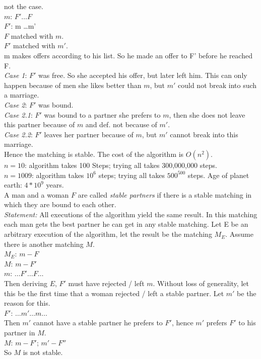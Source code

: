 not the case.\\
$m$: $F' \dots F$ \\
$F'$: m \dots m' \\
$F$ matched with $m$. \\
$F'$ matched with $m'$. \\
m makes offers according to his list. So he made an offer to F' before he
reached F.\\
\emph{Case 1}: $F'$ was free. So she accepted his offer, but later
left him.
This can only happen because of men she likes better than $m$, but $m'$ could not break
into such a marriage. \\
\emph{Case 2}: $F'$ was bound. \\
\emph{Case 2.1}: $F'$ was bound to a partner she prefers to $m$,
then she does not leave this partner because of $m$ and def. not because of $m'$.\\
\emph{Case 2.2}: $F'$ leaves her partner because of $m$, but $m'$
cannot break into this marriage. \\
Hence the matching is stable. The cost of the algorithm is $O(n^2)$. \\
$n=10$: algorithm takes 100 Steps; trying all takes 300,000,000 steps. \\
$n=1009$: algorithm takes $10^6$ steps;  trying all takes $500^500$ steps. Age
of planet earth: $4*10^9$ years.\\
A man and a woman $F$ are called \emph{stable partners} if there is a stable
matching in which they are bound to each other. \\
\emph{Statement:} All executions of the algorithm yield the same result. In this
matching each man gets the best partner he can get in any stable matching. Let E
be an arbitrary execution of the algorithm, let the result be the matching
$M_{E}$. Assume there is another matching $M$.\\
$M_{E}$: $m - F$ \\
$M$: $m - F'$ \\
$m$: $\dots F' \dots F \dots$ \\
Then deriving $E$, $F'$ must have rejected / left $m$. Without loss of
generality, let this be the first time that a woman rejected / left a stable
partner. Let $m'$ be the reason for this.\\
$F'$: $\dots m' \dots m \dots$ \\
Then $m'$ cannot have a stable partner he prefers to $F'$, hence $m'$ prefers
$F'$ to his partner in $M$.\\
$M$: $m - F'$; $m' - F''$\\
So $M$ is not stable.


